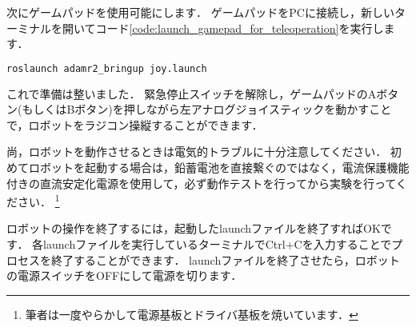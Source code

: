 \documentclass[{../../master}]{subfiles}
\begin{document}
次にゲームパッドを使用可能にします．
ゲームパッドをPCに接続し，新しいターミナルを開いてコード\ref{code:launch_gamepad_for_teleoperation}を実行します．

\begin{lstlisting}[language=sh, label=code:launch_gamepad_for_teleoperation, caption=Launch \textsf{joy.launch}]
roslaunch adamr2_bringup joy.launch
\end{lstlisting}

これで準備は整いました．
緊急停止スイッチを解除し，ゲームパッドのAボタン(もしくはBボタン)を押しながら左アナログジョイスティックを動かすことで，ロボットをラジコン操縦することができます．

尚，ロボットを動作させるときは電気的トラブルに十分注意してください．
初めてロボットを起動する場合は，鉛蓄電池を直接繋ぐのではなく，電流保護機能付きの直流安定化電源を使用して，必ず動作テストを行ってから実験を行ってください．
\footnote{筆者は一度やらかして電源基板とドライバ基板を焼いています．}

ロボットの操作を終了するには，起動したlaunchファイルを終了すればOKです．
各launchファイルを実行しているターミナルで\textsf{Ctrl+C}を入力することでプロセスを終了することができます．
launchファイルを終了させたら，ロボットの電源スイッチをOFFにして電源を切ります．
\end{document}
